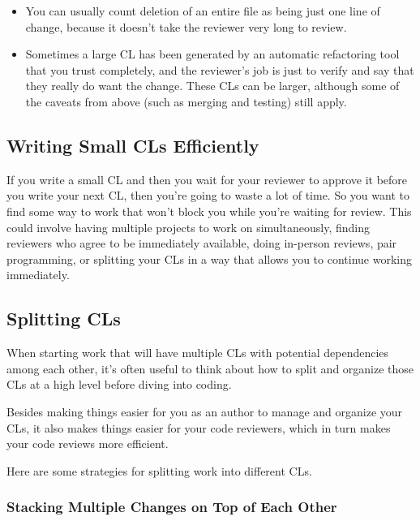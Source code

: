 \documentclass[
]{article}
\providecommand{\tightlist}{%
  \setlength{\itemsep}{0pt}\setlength{\parskip}{0pt}}
\begin{document}
\begin{itemize}
\tightlist
\item
  You can usually count deletion of an entire file as being just one
  line of change, because it doesn't take the reviewer very long to
  review.
\item
  Sometimes a large CL has been generated by an automatic refactoring
  tool that you trust completely, and the reviewer's job is just to
  verify and say that they really do want the change. These CLs can be
  larger, although some of the caveats from above (such as merging and
  testing) still apply.
\end{itemize}

\subsection{Writing Small CLs Efficiently}\label{efficiently}

If you write a small CL and then you wait for your reviewer to approve
it before you write your next CL, then you're going to waste a lot of
time. So you want to find some way to work that won't block you while
you're waiting for review. This could involve having multiple projects
to work on simultaneously, finding reviewers who agree to be immediately
available, doing in-person reviews, pair programming, or splitting your
CLs in a way that allows you to continue working immediately.

\subsection{Splitting CLs}\label{splitting}

When starting work that will have multiple CLs with potential
dependencies among each other, it's often useful to think about how to
split and organize those CLs at a high level before diving into coding.

Besides making things easier for you as an author to manage and organize
your CLs, it also makes things easier for your code reviewers, which in
turn makes your code reviews more efficient.

Here are some strategies for splitting work into different CLs.

\subsubsection{Stacking Multiple Changes on Top of Each
Other}\label{stacking}
\end{document}
